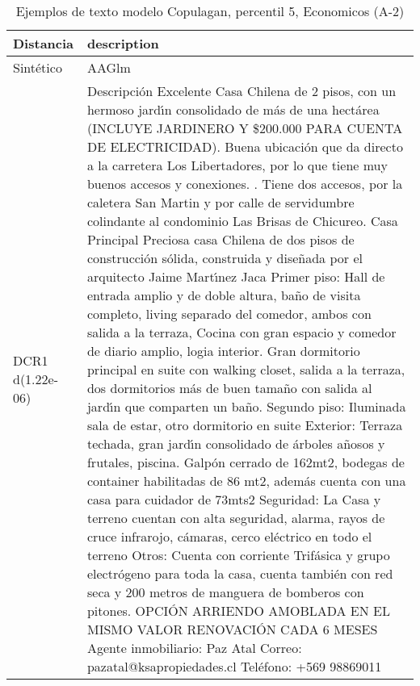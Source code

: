 \begin{table}[H]
\centering
\fontsize{10}{14}\selectfont
\caption{Ejemplos de texto modelo Copulagan, percentil 5, Economicos (A-2)}
\label{table-example-economicos-a-2-copulagan-5p-text}
\begin{tabular}{|l|m{35em}|}
\hline
\rowcolor[gray]{0.8}
Distancia & description \\
\hline Sintético & AAGlm \\
\hline DCR1 d(1.22e-06) & Descripci\'on Excelente Casa Chilena de 2 pisos, con un hermoso jard{\'\i}n consolidado de m\'as de una hect\'area (INCLUYE JARDINERO Y \$200.000 PARA CUENTA DE ELECTRICIDAD). Buena ubicaci\'on que da directo a la carretera Los Libertadores, por lo que tiene muy buenos accesos y conexiones. . Tiene dos accesos, por la caletera San Martin y por calle de servidumbre colindante al condominio Las Brisas de Chicureo.  Casa Principal Preciosa casa Chilena de dos pisos de construcci\'on s\'olida, construida y dise\~nada por el arquitecto Jaime Mart{\'\i}nez Jaca  Primer piso: Hall de entrada amplio y de doble altura, ba\~no de visita completo, living separado del comedor, ambos con salida a la terraza, Cocina con gran espacio y comedor de diario amplio, logia interior. Gran dormitorio principal en suite con walking closet, salida a la terraza, dos dormitorios m\'as de buen tama\~no con salida al jard{\'\i}n que comparten un ba\~no.  Segundo piso: Iluminada sala de estar, otro dormitorio en suite  Exterior: Terraza techada, gran jard{\'\i}n consolidado de \'arboles a\~nosos y frutales, piscina. Galp\'on cerrado de 162mt2, bodegas de container habilitadas de 86 mt2, adem\'as cuenta con una casa para cuidador de 73mts2  Seguridad: La Casa y terreno cuentan con alta seguridad, alarma, rayos de cruce infrarojo, c\'amaras, cerco el\'ectrico en todo el terreno  Otros: Cuenta con corriente Trif\'asica y grupo electr\'ogeno para toda la casa, cuenta tambi\'en con red seca y 200 metros de manguera de bomberos con pitones.  OPCI\'ON ARRIENDO AMOBLADA EN EL MISMO VALOR RENOVACI\'ON CADA 6 MESES  Agente inmobiliario: Paz Atal  Correo: pazatal@ksapropiedades.cl Tel\'efono: +569 98869011 \\

\end{tabular}
\end{table}
